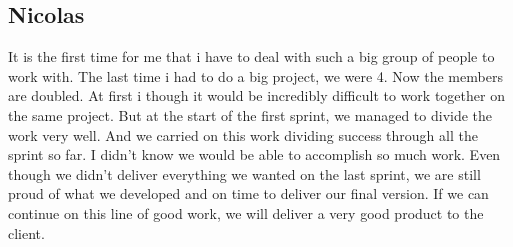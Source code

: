 \subsection{Nicolas}
It is the first time for me that i have to deal with such a big group of people to work with. The last time i had to do a big project, we were 4. Now the members are doubled. At first i though it would be incredibly difficult to work together on the same project. But at the start of the first sprint, we managed to divide the work very well. And we carried on this work dividing success through all the sprint so far. I didn't know we would be able to accomplish so much work. Even though we didn't deliver everything we wanted on the last sprint, we are still proud of what we developed and on time to deliver our final version. If we can continue on this line of good work, we will deliver a very good product to the client.
